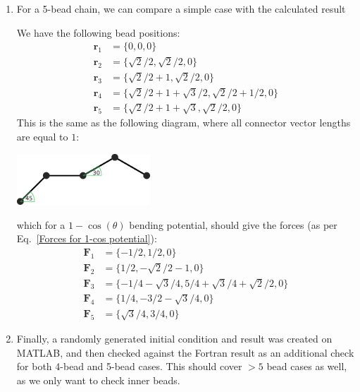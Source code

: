 \documentclass{article}
\begin{document}
\begin{enumerate}
    \item For a 5-bead chain, we can compare a simple case with the calculated result
    
\noindent We have the following bead positions:
\begin{align*}
    \bm{r}_1 &= \{ 0, 0, 0 \} \\
    \bm{r}_2 &= \{ \sqrt{2}/2, \sqrt{2}/2, 0 \} \\
    \bm{r}_3 &= \{ \sqrt{2}/2+1, \sqrt{2}/2, 0 \} \\
    \bm{r}_4 &= \{ \sqrt{2}/2+1+\sqrt{3}/2, \sqrt{2}/2+1/2, 0 \} \\
    \bm{r}_5 &= \{ \sqrt{2}/2+1+\sqrt{3}, \sqrt{2}/2, 0 \}
\end{align*}
This is the same as the following diagram, where all connector vector lengths are equal to $1$:

\includegraphics[width=5cm,height=!]{5_beads_example.eps}

which for a $1-\cos(\theta)$ bending potential, should give the forces (as per Eq.~\eqref{Forces for 1-cos potential}):
\begin{align*}
    \bm{F}_1 &= \{ -1/2, 1/2, 0 \} \\
    \bm{F}_2 &= \{ 1/2, -\sqrt{2}/2-1, 0 \} \\
    \bm{F}_3 &= \{ -1/4-\sqrt{3}/4, 5/4+\sqrt{3}/4+\sqrt{2}/2, 0 \} \\
    \bm{F}_4 &= \{ 1/4, -3/2-\sqrt{3}/4, 0 \} \\
    \bm{F}_5 &= \{ \sqrt{3}/4, 3/4, 0 \}
\end{align*}

    \item Finally, a randomly generated initial condition and result was created on MATLAB, and then checked against the Fortran result as an additional check for both 4-bead and 5-bead cases. This should cover $>5$ bead cases as well, as we only want to check inner beads.

\end{enumerate}
\end{document}
